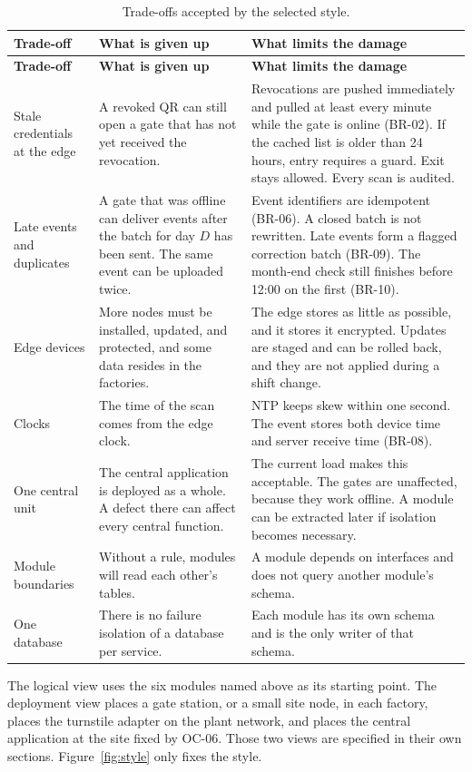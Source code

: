 \begin{longtable}{@{}L{3.15cm}L{5.75cm}L{5.85cm}@{}}
\caption{Trade-offs accepted by the selected style.}
\label{tab:tradeoffs}\\
\toprule
\textbf{Trade-off} & \textbf{What is given up} & \textbf{What limits the damage}\\
\midrule
\endfirsthead
\toprule
\textbf{Trade-off} & \textbf{What is given up} & \textbf{What limits the damage}\\
\midrule
\endhead
Stale credentials at the edge &
A revoked QR can still open a gate that has not yet received the revocation. &
Revocations are pushed immediately and pulled at least every minute while the gate is online (BR-02).
If the cached list is older than 24 hours, entry requires a guard.
Exit stays allowed.
Every scan is audited.\\
\addlinespace
Late events and duplicates &
A gate that was offline can deliver events after the batch for day \(D\) has been sent.
The same event can be uploaded twice. &
Event identifiers are idempotent (BR-06).
A closed batch is not rewritten.
Late events form a flagged correction batch (BR-09).
The month-end check still finishes before 12:00 on the first (BR-10).\\
\addlinespace
Edge devices &
More nodes must be installed, updated, and protected, and some data resides in the factories. &
The edge stores as little as possible, and it stores it encrypted.
Updates are staged and can be rolled back, and they are not applied during a shift change.\\
\addlinespace
Clocks &
The time of the scan comes from the edge clock. &
NTP keeps skew within one second.
The event stores both device time and server receive time (BR-08).\\
\addlinespace
One central unit &
The central application is deployed as a whole.
A defect there can affect every central function. &
The current load makes this acceptable.
The gates are unaffected, because they work offline.
A module can be extracted later if isolation becomes necessary.\\
\addlinespace
Module boundaries &
Without a rule, modules will read each other's tables. &
A module depends on interfaces and does not query another module's schema.\\
\addlinespace
One database &
There is no failure isolation of a database per service. &
Each module has its own schema and is the only writer of that schema.\\
\bottomrule
\end{longtable}

The logical view uses the six modules named above as its starting point.
The deployment view places a gate station, or a small site node, in each factory, places the turnstile adapter on the plant network, and places the central application at the site fixed by OC-06.
Those two views are specified in their own sections.
Figure~\ref{fig:style} only fixes the style.
